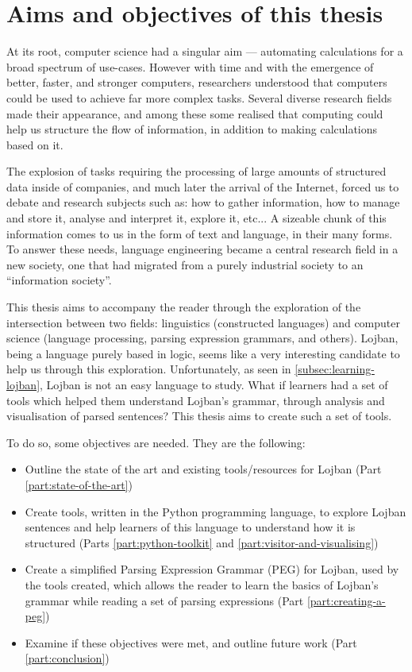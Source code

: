 \chapter{Aims and objectives of this thesis}

\vspace{0.5cm}

At its root, computer science had a singular aim --- automating calculations for a broad spectrum of use-cases.
However with time and with the emergence of better, faster, and stronger computers, researchers understood that computers could be used to achieve
far more complex tasks. Several diverse research fields made their appearance, and among these some realised that computing could help us structure the
flow of information, in addition to making calculations based on it. \newline

The explosion of tasks requiring the processing of large amounts of structured data inside of companies, and much later the arrival of the Internet,
forced us to debate and research subjects such as: how to gather information, how to manage and store it, analyse and interpret it, explore it, etc...
A sizeable chunk of this information comes to us in the form of text and language, in their many forms. To answer these needs, language engineering became a
central research field in a new society, one that had migrated from a purely industrial society to an ``information society''.\newline

This thesis aims to accompany the reader through the exploration of the intersection between two fields: linguistics (constructed languages)
and computer science (language processing, parsing expression grammars, and others). Lojban, being a language purely based in logic, seems like a very
interesting candidate to help us through this exploration. Unfortunately, as seen in \ref{subsec:learning-lojban}, Lojban is not an easy language to study.
What if learners had a set of tools which helped them understand Lojban's grammar, through analysis and visualisation of parsed sentences?
This thesis aims to create such a set of tools.\newline

\newpage

To do so, some objectives are needed. They are the following:
\begin{itemize}
\item Outline the state of the art and existing tools/resources for Lojban (Part \ref{part:state-of-the-art})
\item Create tools, written in the Python programming language, to explore Lojban sentences and help learners of this
language to understand how it is structured (Parts \ref{part:python-toolkit} and \ref{part:visitor-and-visualising})
\item Create a simplified Parsing Expression Grammar (PEG) for Lojban, used by the tools created,
which allows the reader to learn the basics of Lojban's grammar while reading a set of parsing expressions (Part \ref{part:creating-a-peg})
\item Examine if these objectives were met, and outline future work (Part \ref{part:conclusion})
\end{itemize}